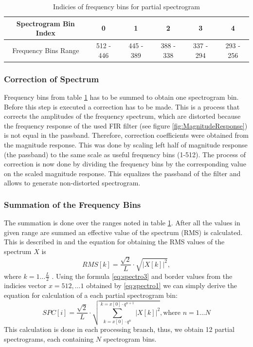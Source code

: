 \documentclass[twoside]{ctuthesis}
\theoremstyle{plain}
\theoremstyle{definition}
\theoremstyle{note}
\begin{document}
\begin{table}[htbp]
	\centering
	\caption{Indicies of frequency bins for partial spectrogram}
	\begin{tabular}{cccccc}
		\toprule
		Spectrogram Bin Index & 0 & 1 & 2 & 3 & 4 \\
		\midrule
		Frequency Bins Range  & 512 - 446  & 445 - 389 & 388 - 338 & 337 - 294 & 293 - 256  \\
		\bottomrule
	\end{tabular}%
	\label{tab:indiciesBins}%
\end{table}%

\subsubsection{Correction of Spectrum}
Frequency bins from table \ref{tab:indiciesBins} has to be summed to obtain one spectrogram bin. Before this step is executed a correction has to be made. This is a process that corrects the amplitudes of the frequency spectrum, which are distorted because the frequency response of the used FIR filter (see figure \ref{fig:MagnitudeResponse}) is not equal in the passband. Therefore, correction coefficients were obtained from the magnitude response. This was done by scaling left half of magnitude response (the passband) to the same scale as useful frequency bins (1-512). The process of correction is now done by dividing the frequency bins by the corresponding value on the scaled magnitude response. This equalizes the passband of the filter and allows to generate non-distorted spectrogram.

\subsubsection{Summation of the Frequency Bins}
The summation is done over the ranges noted in table \ref{tab:indiciesBins}. After all the values in given range are summed an effective value of the spectrum (RMS) is calculated. This is described in \cite{cite:1} and the equation for obtaining the RMS values of the spectrum $X$ is  
\begin{equation} \label{eq:spectro3}
	RMS[k]=\frac{\sqrt{2}}{L}\cdot \sqrt{|X[k]|^2},
\end{equation}
where $k=1\ldots \frac{L}{2}$ \cite{cite:1}.
Using the formula \ref{eq:spectro3} and border values from the indicies vector $x=512,\ldots1$ obtained by \ref{eq:spectro1} we can simply derive the equation for calculation of a each partial spectrogram bin:
\begin{equation} \label{eq:spectro4}
	SPC[i]=\frac{\sqrt{2}}{L}\cdot \sqrt{\sum_{k=x[0]\cdot q^n}^{k=x[0]\cdot q^{n+1}}|X[k]|^2}, \text{where }n=1\ldots N
\end{equation}
This calculation is done in each processing branch, thus, we obtain 12 partial spectrograms, each containing $N$ spectrogram bins.
\end{document}
